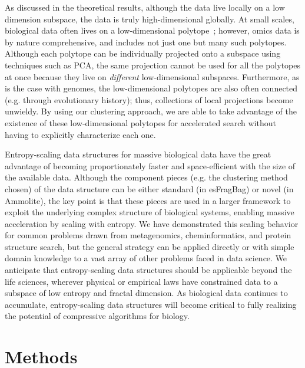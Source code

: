 \documentclass[review,preprint,12pt]{elsarticle}
\renewcommand{\cite}{\citep} %
\theoremstyle{definition}
\theoremstyle{remark}
\numberwithin{equation}{section}
\begin{document}
As discussed in the theoretical results, although the data live locally on a 
low dimension subspace, the data is truly high-dimensional globally.
At small scales, biological data often lives on a low-dimensional polytope~\cite{hart2015inferring}; however, omics data is by nature comprehensive, and includes not just one but many such polytopes.
Although each polytope can be individually projected onto a subspace using techniques such as PCA, the same projection cannot be used for all the polytopes at once because they live on \textit{different} low-dimensional 
subspaces.
Furthermore, as is the case with genomes, the low-dimensional polytopes are also often connected (e.g. through evolutionary history); thus, collections of local projections become unwieldy.
By using our clustering approach, we are able to take advantage of the existence of these low-dimensional polytopes for accelerated search without having to explicitly characterize each one.

Entropy-scaling data structures for massive biological data have the great
advantage of becoming proportionately faster and space-efficient with the
size of the available data.
Although the component pieces (e.g. the clustering method chosen) of the data structure can be either standard (in esFragBag) or novel (in Ammolite), the key point is that these pieces are used in a larger framework to exploit the underlying complex structure of biological systems, enabling massive acceleration by scaling with entropy.
We have demonstrated this scaling behavior for common problems drawn from
metagenomics, cheminformatics, and protein structure search, but the general strategy can be applied
directly or with simple domain knowledge to a vast array of other problems
faced in data science.
We anticipate that entropy-scaling data structures should be applicable beyond
the life sciences, wherever physical or empirical laws have constrained data to 
a subspace of low entropy and fractal dimension.
As biological data continues to accumulate, entropy-scaling data structures
will become critical to fully realizing the potential of compressive
algorithms for biology. 

\section{Methods}
\end{document}

